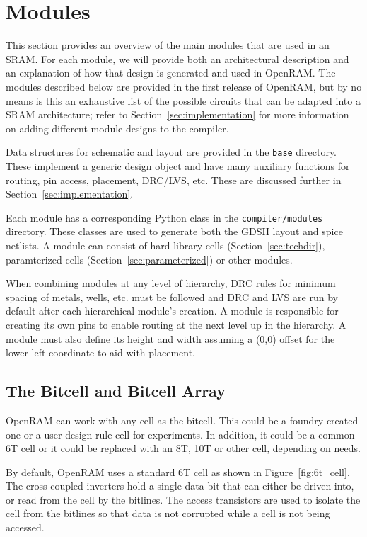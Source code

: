 \section{Modules}
\label{sec:modules}

This section provides an overview of the main modules that are used in
an SRAM.  For each module, we will provide both an architectural
description and an explanation of how that design is generated and
used in OpenRAM.  The modules described below are provided in the
first release of OpenRAM, but by no means is this an exhaustive list
of the possible circuits that can be adapted into a SRAM architecture;
refer to Section~\ref{sec:implementation} for more information on
adding different module designs to the compiler.

Data structures for schematic and layout are provided in the
\verb|base| directory. These implement a generic design object and
have many auxiliary functions for routing, pin access, placement,
DRC/LVS, etc.  These are discussed further in
Section~\ref{sec:implementation}.

Each module has a corresponding Python class in the
\verb|compiler/modules| directory.  These classes are used to generate
both the GDSII layout and spice netlists. A module can consist of
hard library cells (Section~\ref{sec:techdir}), paramterized
cells (Section~\ref{sec:parameterized}) or other modules.

When combining modules at any level of hierarchy, DRC rules for
minimum spacing of metals, wells, etc. must be followed and DRC and
LVS are run by default after each hierarchical module's creation. A
module is responsible for creating its own pins to enable routing
at the next level up in the hierarchy. A module must also define its
height and width assuming a (0,0) offset for the lower-left coordinate
to aid with placement.


\subsection{The Bitcell and Bitcell Array}
\label{sec:bitcellarray}

OpenRAM can work with any cell as the bitcell. This could be a foundry
created one or a user design rule cell for experiments.  In addition,
it could be a common 6T cell or it could be replaced with an 8T, 10T
or other cell, depending on needs.

By default, OpenRAM uses a standard 6T cell as shown in 
Figure~\ref{fig:6t_cell}.  The cross coupled inverters hold a single
data bit that can either be driven into, or read from the cell by the
bitlines.  The access transistors are used to isolate the cell from
the bitlines so that data is not corrupted while a cell is not being
accessed.

